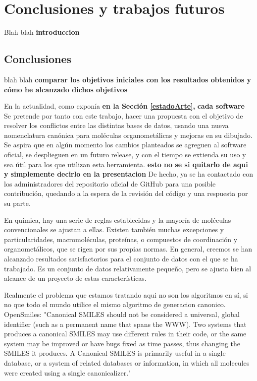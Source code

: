\chapter{Conclusiones y trabajos futuros}

Blah blah \textbf{introduccion}

\section{Conclusiones}

blah blah \textbf{comparar los objetivos iniciales con los resultados obtenidos y cómo he alcanzado dichos objetivos}

En la actualidad, como exponía \textbf{en la Sección \ref{estadoArte}, } \textbf{cada software }
Se pretende por tanto con este trabajo, hacer una propuesta con el objetivo de resolver los conflictos entre las distintas bases de datos, usando una nueva nomenclatura canónica para moléculas organometálicas y mejoras en su dibujado.
Se aspira que en algún momento los cambios planteados se agreguen al software oficial, se desplieguen en un futuro release, y con el tiempo se extienda su uso y sea útil para los que utilizan esta herramienta. \textbf{esto no se si quitarlo de aqui y simplemente decirlo en la presentacion} De hecho, ya se ha contactado con los administradores del repositorio oficial de GitHub para una posible contribución, quedando a la espera de la revisión del código y una respuesta por su parte.

En química, hay una serie de reglas establecidas y la mayoría de moléculas convencionales se ajustan a ellas. Existen también muchas excepciones y particularidades, macromoléculas, proteínas, o compuestos de coordinación y organometálicos, que se rigen por sus propias normas. En general, creemos se han alcanzado resultados satisfactorios para el conjunto de datos con el que se ha trabajado. Es un conjunto de datos relativamente pequeño, pero se ajusta bien al alcance de un proyecto de estas características. 

Realmente el problema que estamos tratando aqui no son los algoritmos en sí, si no que todo el mundo utilice el mismo algoritmo de generacion canonico. OpenSmiles: "Canonical SMILES should not be considered a universal, global identifier (such as a permanent name that spans the WWW). Two systems that produces a canonical SMILES may use different rules in their code, or the same system may be improved or have bugs fixed as time passes, thus changing the SMILES it produces. A Canonical SMILES is primarily useful in a single database, or a system of related databases or information, in which all molecules were created using a single canonicalizer."

